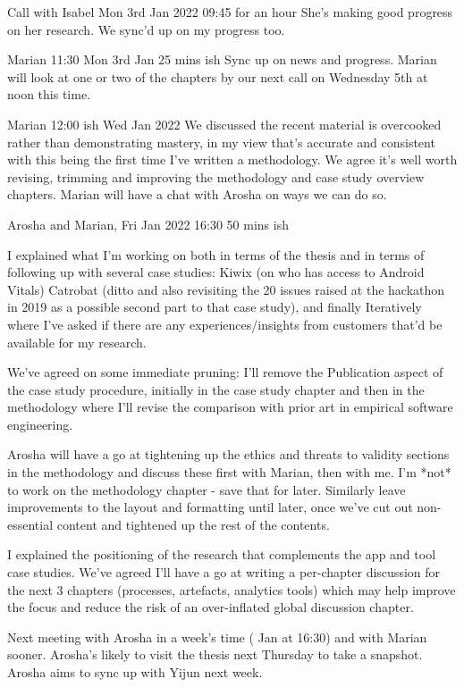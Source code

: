 Call with Isabel Mon 3rd Jan 2022 09:45 for an hour
She’s making good progress on her research. We sync’d up on my progress too. 

Marian 11:30 Mon 3rd Jan 25 mins ish
Sync up on news and progress. Marian will look at one or two of the chapters by our next call on Wednesday 5th at noon this time.

Marian 12:00 ish Wed  Jan 2022
We discussed the recent material is overcooked rather than demonstrating mastery, in my view that's accurate and consistent with this being the first time I've written a methodology. We agree it's well worth revising, trimming and improving the methodology and case study overview chapters. Marian will have a chat with Arosha on ways we can do so.

Arosha and Marian, Fri  Jan 2022 16:30 50 mins ish

I explained what I'm working on both in terms of the thesis and in terms of following up with several case studies: Kiwix (on who has access to Android Vitals) Catrobat (ditto and also revisiting the 20 issues raised at the hackathon in 2019 as a possible second part to that case study), and finally Iteratively where I've asked if there are any experiences/insights from customers that'd be available for my research.

We've agreed on some immediate pruning: I'll remove the Publication aspect of the case study procedure, initially in the case study chapter and then in the methodology where I'll revise the comparison with prior art in empirical software engineering.

Arosha will have a go at tightening up the ethics and threats to validity sections in the methodology and discuss these first with Marian, then with me. I'm *not* to work on the methodology chapter - save that for later. Similarly leave improvements to the layout and formatting until later, once we've cut out non-essential content and tightened up the rest of the contents.

I explained the positioning of the research that complements the app and tool case studies. We've agreed I'll have a go at writing a per-chapter discussion for the next 3 chapters (processes, artefacts, analytics tools) which may help improve the focus and reduce the risk of an over-inflated global discussion chapter.


Next meeting with Arosha in a week's time ( Jan at 16:30) and with Marian sooner. Arosha's likely to visit the thesis next Thursday to take a snapshot. Arosha aims to sync up with Yijun next week.

\dotfill
